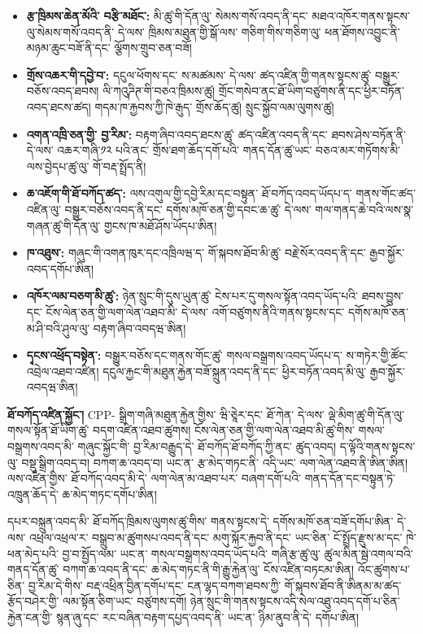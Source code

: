 \documentclass[11pt]{article}
\begin{document}
\begin{itemize}[leftmargin=*]
\item \textbf{རྩ་ཁྲིམས་ཆེན་མོའི་ བརྩི་མཐོང་:} མི་ཚུ་གི་དོན་ལུ་ སེམས་གསོ་འབད་ནི་དང་ མཐའ་འཁོར་གནས་སྟངས་ལུ་སེམས་གསོ་འབད་ནི་ དེ་ལས་ ཁྲིམས་མཐུན་གྱི་སྒོ་ལས་ གཅིག་གིས་གཅིག་ལུ་ ཕན་ཐོགས་འབྱུང་ནི་ མཉམ་ཆུང་བཟོ་ནི་དང་ ལྕོགས་གྲུབ་ཅན་བཟོ།
\item \textbf{གྲོས་འཆར་གི་དབྱེ་བ་:} དངུལ་ཕོགས་དང་ ས་མཚམས་ དེ་ལས་ ཚད་འཛིན་གྱི་གནས་སྟངས་ཚུ་ བསྒྱུར་བཅོས་འབད་ཐབས། ལི་ཀའུཌིཊ་གི་བཅའ་ཁྲིམས་ཚུ། གྲོང་གསེབ་ནང་ཐོ་ཡིག་བཙུགས་ནི་དང་ཕྱིར་བཏོན་འབད་ཐངས་ཚད། གདམ་ཁ་རྐྱབས་ཀྱི་ཁེ་རྒུད་ གྲོས་ཆོད་ཚུ། སྲུང་སྐྱོབ་ལམ་ལུགས་ཚུ།
\item \textbf{འགན་འཁྲི་ཅན་གྱི་ བྱ་རིམ་:} བརྟག་ཞིབ་འབད་ཐངས་ཚུ་ ཚད་འཛིན་འབད་ནི་དང་ ཐབས་ཤེས་བཏོན་ནི་ དེ་ལས་ འཆར་གཞི་༡༢ པའི་ནང་ གྲོས་ཐག་ཆོད་དགོ་པའི་ གནད་དོན་ཚུ་ཡང་ བཅའ་མར་གཏོགས་མི་ ལས་བྱེདཔ་ཚུ་ལུ་ གོ་བརྡ་སྤྲོད་ནི།
\item \textbf{ཆ་འཇོག་གི་ཐོ་བཀོད་ཚད་:} ལས་འགུལ་གྱི་དབྱེ་རིམ་དང་བསྟུན་ ཐོ་བཀོད་འབད་ཡོདཔ་ད་ གནས་གོང་ཚད་འཛིན་ལུ་ བསྒྱུར་བཅོས་འབད་ནི་དང་ དགོས་མཁོ་ཅན་གྱི་དབང་ཆ་ཚུ་ དེ་ལས་ གལ་གནད་ཆེ་བའི་ལས་སྣ་གཞན་ཚུ་གི་དོན་ལུ་ གྱངས་ཁ་མཐོ་ཤོས་ཡོདཔ་ཨིན།
\item \textbf{ཁ་འཐུས་:} གཞུང་གི་འགན་ཁུར་དང་འཁྲིལཝ་ད་ གོ་སྐབས་ཐོབ་མི་ཚུ་ བརྗེ་སོར་འབད་ནི་དང་ རྒྱབ་སྐྱོར་འབད་དགོཔ་ཨིན།
\item \textbf{འཁོར་ལམ་བཅག་མི་ཚུ་:} ཉེན་སྲུང་གི་དུས་ཡུན་ཚུ་ ངེས་པར་དུ་གསལ་སྟོན་འབད་ཡོད་པའི་ ཐབས་བྱུས་དང་ ངོས་ལེན་ཅན་གྱི་ལག་ལེན་འཐབ་མི་ དེ་ལས་ འགོ་བཙུགས་ནིའི་གནས་སྟངས་དང་ དགོས་མཁོ་ཅན་མ་ཤི་བའི་ཤུལ་ལུ་ བརྟག་ཞིབ་འབདཝ་ཨིན།
\item \textbf{དྭངས་འཕྲོད་བསྟེན་:} བསྒྱུར་བཅོས་དང་གནས་གོང་ཚུ་ གསལ་བསྒྲགས་འབད་ཡོདཔ་ད་ ས་གཏེར་གྱི་ཚོང་འབྲེལ་འཐབ་འཛིན། དངུལ་རྐྱང་གི་མཐུན་རྐྱེན་བཟོ་སྐྲུན་འབད་ནི་དང་ ཕྱིར་བཏོན་འབད་མི་ལུ་ རྒྱབ་སྐྱོར་འབདཝ་ཨིན།
\end{itemize}
\textbf{ཐོ་བཀོད་འཛིན་སྐྱོང་།} CPP- སྒྲིག་གཞི་མཐུན་རྐྱེན་གྱིས་ ཝི་ཅཱེར་དང་ ཐོ་ཀེན་ དེ་ལས་ ལྡེ་མིག་ཚུ་གི་དོན་ལུ་ གསལ་སྟོན་ཐོ་ཡིག་ཚུ་ བདག་འཛིན་འཐབ་ཚུགས། ངོས་ལེན་ཅན་གྱི་ལག་ལེན་འཐབ་མི་ཚུ་གིས་ གསལ་བསྒྲགས་འབད་མི་ གཞུང་སྐྱོང་གི་ བྱ་རིམ་བརྒྱུད་དེ་ ཐོ་བཀོད་ཐོ་བཀོད་ཀྱི་ནང་ ཚུད་འབད། ད་ལྟོའི་གནས་སྟངས་ལུ་ བསྡུ་སྒྲིག་འབད་བ། བཀག་ཆ་འབད་བ། ཡང་ན་ རྩ་མེད་གཏང་ནི་ འདི་ཡང་ ལག་ལེན་འཐབ་ནི་ཨིན་ཨིན། ལས་འཛིན་གྱིས་ ཐོ་བཀོད་འབད་མི་དེ་ ལག་ལེན་མ་འཐབ་པར་ བཞག་དགོ་པའི་ གནད་དོན་དང་བསྟུན་ཏེ་ འཁྲུན་ཆོད་དེ་ ཆ་མེད་གཏང་དགོཔ་ཨིན།

དཔར་བསྐྲུན་འབད་མི་ ཐོ་བཀོད་ཁྲིམས་ལུགས་ཚུ་གིས་ གནས་སྟངས་དེ་ དགོས་མཁོ་ཅན་བཟོ་དགོཔ་ཨིན་ དེ་ལས་ འཕྲལ་འཕྲལ་ར་ བསྒྲུབ་མ་ཚུགསཔ་འབད་ནི་དང་ མགུ་སྐོར་རྐྱབ་ནི་དང་ ཡང་ཅིན་ ངོ་སྤྲོད་རྫུས་མ་དང་ ཁེ་ཕན་མེད་པའི་ བྱ་བ་སྤྱོད་ལམ་ ཡང་ན་ གསལ་བསྒྲགས་འབད་ཡོད་པའི་ གཞི་རྩ་ཚུ་ལུ་ ཚུལ་མིན་སྦེ་འགལ་བའི་ གནད་དོན་ཚུ་ བཀག་ཆ་འབད་ནི་དང་ ཆ་མེད་གཏང་ནི་གི་རྒྱུ་རྐྱེན་ལུ་ ངོས་འཛིན་བཏངམ་ཨིན། འོང་ཚུགས་པ་ཅིན་ བྱ་རིམ་དེ་གིས་ བརྡ་འཕྲིན་བྱིན་དགོཔ་དང་ ངན་ལྷད་བཀག་ཐབས་ཀྱི་ གོ་སྐབས་ཐོབ་ནི་ཨིནམ་མ་ཚད་ རྩོད་བཤེར་གྱི་ ལམ་སྟོན་ཅིག་ཡང་ བཙུགས་དགོ། ཉེན་སྲུང་གི་གནས་སྟངས་འདི་སེལ་འཐུ་འབད་དགོ་པ་ཅིན་ རྐྱེན་ངན་གྱི་ སྙན་ཞུ་དང་ རང་བཞིན་བརྟག་དཔྱད་འབད་ནི་ ཡང་ན་ ཉིམ་ནུབ་ནི་དེ་ དགོཔ་ཨིན།
\end{document}
